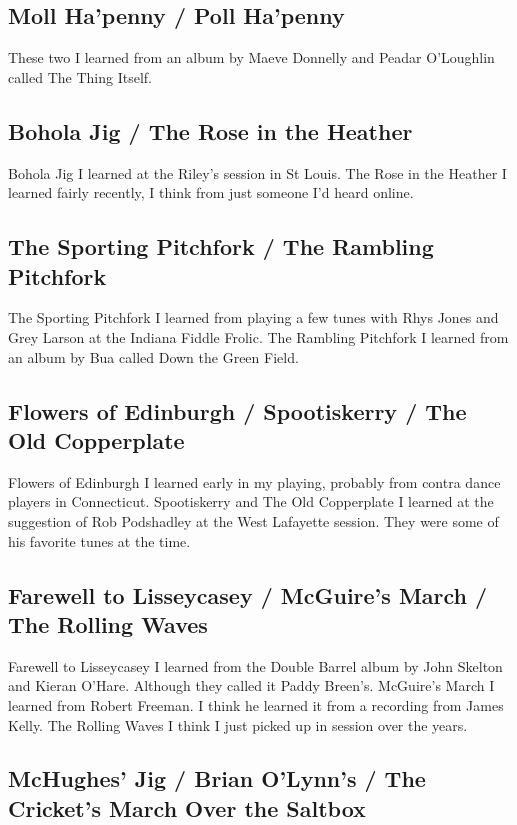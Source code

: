 \documentclass[9pt,letterpaper]{article}
\begin{document}
{\subsection{Moll Ha'penny / Poll Ha'penny}

These two I learned from an album by Maeve Donnelly and Peadar O'Loughlin called The Thing Itself.

\subsection{Bohola Jig / The Rose in the Heather}

Bohola Jig I learned at the Riley's session in St Louis. The Rose in the Heather I learned fairly recently, I think from just someone I'd heard online.

\subsection{The Sporting Pitchfork / The Rambling Pitchfork}

The Sporting Pitchfork I learned from playing a few tunes with Rhys Jones and Grey Larson at the Indiana Fiddle Frolic. The Rambling Pitchfork I learned from an album by Bua called Down the Green Field.

\subsection{Flowers of Edinburgh / Spootiskerry / The Old Copperplate}

Flowers of Edinburgh I learned early in my playing, probably from contra dance players in Connecticut. Spootiskerry and The Old Copperplate I learned at the suggestion of Rob Podshadley at the West Lafayette session. They were some of his favorite tunes at the time.

\subsection{Farewell to Lisseycasey / McGuire's March / The Rolling Waves}

Farewell to Lisseycasey I learned from the Double Barrel album by John Skelton and Kieran O'Hare. Although they called it Paddy Breen's. McGuire's March I learned from Robert Freeman. I think he learned it from a recording from James Kelly. The Rolling Waves I think I just picked up in session over the years. 

\subsection{McHughes' Jig / Brian O'Lynn's / The Cricket's March Over the Saltbox}

}
\end{document}
